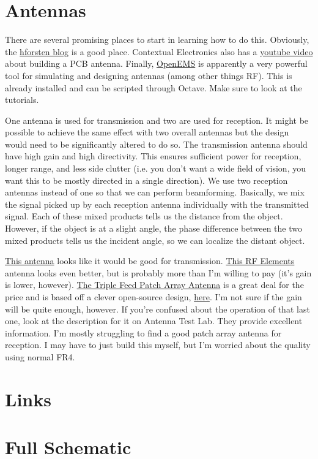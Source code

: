 \documentclass{default}
\newcounter{includepdfpage}
\begin{document}
\chapter{Antennas}
\label{cha:antennas}

There are several promising places to start in learning how to do this. Obviously, the
\href{hforsten.com}{hforsten blog} is a good place. Contextual Electronics also has a
\href{https://www.youtube.com/watch?v=m0B-63Q-R_8}{youtube video} about building a PCB
antenna. Finally, \href{http://openems.de/index.php/Main_Page.html}{OpenEMS} is apparently a very
powerful tool for simulating and designing antennas (among other things RF). This is already
installed and can be scripted through Octave. Make sure to look at the tutorials.

One antenna is used for transmission and two are used for reception. It might be possible to achieve
the same effect with two overall antennas but the design would need to be significantly altered to
do so. The transmission antenna should have high gain and high directivity. This ensures sufficient
power for reception, longer range, and less side clutter (i.e. you don't want a wide field of
vision, you want this to be mostly directed in a single direction). We use two reception antennas
instead of one so that we can perform beamforming. Basically, we mix the signal picked up by each
reception antenna individually with the transmitted signal. Each of these mixed products tells us
the distance from the object. However, if the object is at a slight angle, the phase difference
between the two mixed products tells us the incident angle, so we can localize the distant object.

\href{https://assets.lairdtech.com/home/brandworld/files/ANT-DS-PA58\%201115.pdf}{This antenna}
looks like it would be good for
transmission. \href{https://shop.bizsyscon.com/rf-elements-sh-cc-5-30-symmetrical-horn-carrier-class-30-degree.html#horizontalTab1}{This
  RF Elements} antenna looks even better, but is probably more than I'm willing to pay (it's gain is
lower,
however). \href{https://smile.amazon.com/d/Sewing-Machines-Accessories/9-4dBi-Triple-Antenna-Terminator-RJX1749/B074PR4TW3/ref=sr_1_8?ie=UTF8&qid=1544680544&sr=8-8&keywords=patch+antenna}{The
  Triple Feed Patch Array Antenna} is a great deal for the price and is based off a clever open-source
design,
\href{http://www.maartenbaert.be/quadcopters/antennas/triple-feed-patch-array-antenna/}{here}. I'm
not sure if the gain will be quite enough, however. If you're confused about the operation of that
last one, look at the description for it on Antenna Test Lab. They provide excellent
information. I'm mostly struggling to find a good patch array antenna for reception. I may have to
just build this myself, but I'm worried about the quality using normal FR4.

\chapter{Links}
\label{cha:links}


\chapter{Full Schematic}
\label{cha:schematic}


\end{document}

